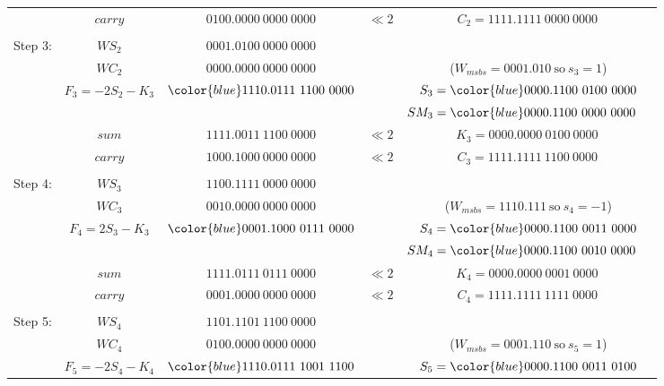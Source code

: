 \documentclass[12pt]{article}
\begin{document}
{\begin{center}
\begin{tabular}{ccccc}
            &$carry         $&$         0100.0000\ 0000\ 0000   $&$\ll2    $&$C_2=1111.1111\ 0000\ 0000\,$\\
    \hdashline\\
    Step 3: &$WS_2          $&$         0001.0100\ 0000\ 0000   $&          &\\
            &$WC_2          $&$         0000.0000\ 0000\ 0000   $&          &($W_{msbs}=0001.010\ \text{so}\ s_3=1$)\\
            &$F_3=-2S_2-K_3$&${\color{blue}1110.0111\ 11}00\ 0000$&         &$S_3={\color{blue}0000.1100\ 01}00\ 0000$\\
            &                &                                   &          &$SM_3={\color{blue}0000.1100\ 00}00\ 0000\phantom{M}$\\
    \cline{2-3}
            &$sum           $&$         1111.0011\ 1100\ 0000   $&$\ll2    $&$K_3=0000.0000\ 0100\ 0000\ $\\
            &$carry         $&$         1000.1000\ 0000\ 0000   $&$\ll2    $&$C_3=1111.1111\ 1100\ 0000\,$\\
    \hdashline\\
    Step 4: &$WS_3          $&$         1100.1111\ 0000\ 0000   $&          &\\
            &$WC_3          $&$         0010.0000\ 0000\ 0000   $&          &($W_{msbs}=1110.111\ \text{so}\ s_4=-1$)\\
            &$F_4=2S_3-K_3  $&${\color{blue}0001.1000\ 0111}\ 0000$&        &$S_4={\color{blue}0000.1100\ 0011}\ 0000$\\
            &                &                                   &          &$SM_4={\color{blue}0000.1100\ 0010}\ 0000\phantom{M}$\\
    \cline{2-3}
            &$sum           $&$         1111.0111\ 0111\ 0000   $&$\ll2    $&$K_4=0000.0000\ 0001\ 0000\ $\\
            &$carry         $&$         0001.0000\ 0000\ 0000   $&$\ll2    $&$C_4=1111.1111\ 1111\ 0000\,$\\
    \hdashline\\
    Step 5: &$WS_4          $&$         1101.1101\ 1100\ 0000   $&          &\\
            &$WC_4          $&$         0100.0000\ 0000\ 0000   $&          &($W_{msbs}=0001.110\ \text{so}\ s_5=1$)\\
            &$F_5=-2S_4-K_4 $&${\color{blue}1110.0111\ 1001\ 11}00$&        &$S_5={\color{blue}0000.1100\ 0011\ 01}00$\\

\end{tabular}
\end{center}}
\end{document}
